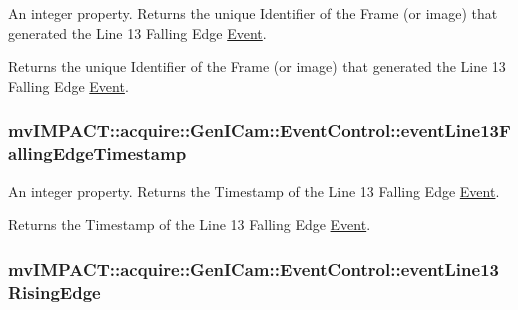 An integer property. Returns the unique Identifier of the Frame (or image) that generated the Line 13 Falling Edge \hyperlink{classmv_i_m_p_a_c_t_1_1acquire_1_1_event}{Event}. 

Returns the unique Identifier of the Frame (or image) that generated the Line 13 Falling Edge \hyperlink{classmv_i_m_p_a_c_t_1_1acquire_1_1_event}{Event}. \hypertarget{classmv_i_m_p_a_c_t_1_1acquire_1_1_gen_i_cam_1_1_event_control_a917eced05fa7429c17f567bcf4810eb6}{
\subsubsection[{event\+Line13\+Falling\+Edge\+Timestamp}]{ mv\+I\+M\+P\+A\+C\+T\+::acquire\+::\+Gen\+I\+Cam\+::\+Event\+Control\+::event\+Line13\+Falling\+Edge\+Timestamp}}\label{classmv_i_m_p_a_c_t_1_1acquire_1_1_gen_i_cam_1_1_event_control_a917eced05fa7429c17f567bcf4810eb6}


An integer property. Returns the Timestamp of the Line 13 Falling Edge \hyperlink{classmv_i_m_p_a_c_t_1_1acquire_1_1_event}{Event}. 

Returns the Timestamp of the Line 13 Falling Edge \hyperlink{classmv_i_m_p_a_c_t_1_1acquire_1_1_event}{Event}. \hypertarget{classmv_i_m_p_a_c_t_1_1acquire_1_1_gen_i_cam_1_1_event_control_a852c08e0a9e24c1a04af5b37a2f6c358}{
\subsubsection[{event\+Line13\+Rising\+Edge}]{ mv\+I\+M\+P\+A\+C\+T\+::acquire\+::\+Gen\+I\+Cam\+::\+Event\+Control\+::event\+Line13\+Rising\+Edge}}\label{classmv_i_m_p_a_c_t_1_1acquire_1_1_gen_i_cam_1_1_event_control_a852c08e0a9e24c1a04af5b37a2f6c358}


